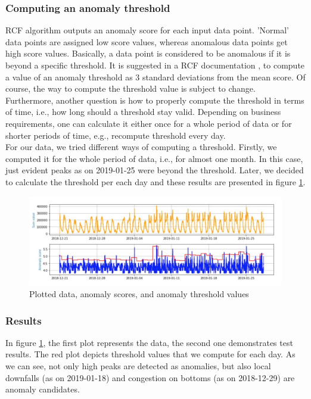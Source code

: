     \subsubsection{Computing an anomaly threshold}
    RCF algorithm outputs an anomaly score for each input data point. 'Normal' data points are assigned low score values, whereas anomalous data points get high score values.
     Basically, a data point is considered to be anomalous if it is beyond a specific threshold. It is suggested in a RCF documentation \cite{awsRcfSagemaker}, to compute a value of an anomaly threshold as 3 standard deviations from the mean score. 
    Of course, the way to compute the threshold value is subject to change. Furthermore, another question is how to properly compute the threshold in terms of time, i.e., how long should a threshold stay valid. Depending on business requirements, one can calculate it either once for a whole period of data or for shorter periods of time, e.g., recompute threshold every day.\\
    For our data, we tried different ways of computing a threshold. Firstly, we computed it for the whole period of data, i.e., for almost one month. In this case, just evident peaks as on 2019-01-25 were beyond the threshold. Later, we decided to calculate the threshold per each day and these results are presented in figure \ref{fig:rcf_results}.
     \begin{figure}[h]
        \centering
        \includegraphics[width=1\textwidth]{images/rcf-results.png}
        \caption{Plotted data, anomaly scores, and anomaly threshold values}
        \label{fig:rcf_results}
    \end{figure}
    \FloatBarrier
    
    \subsubsection{Results}
    In figure \ref{fig:rcf_results}, the first plot represents the data, the second one demonstrates test results. The red plot depicts threshold values that we compute for each day. As we can see, not only high peaks are detected as anomalies, but also local downfalls (as on 2019-01-18) and congestion on bottoms (as on 2018-12-29) are anomaly candidates.
    
